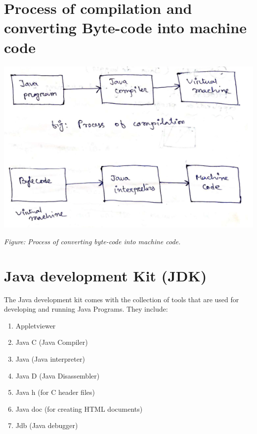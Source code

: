 \documentclass[11pt, a4paper]{book}
\begin{document}
    \section{Process of compilation and converting Byte-code into machine code}
      \includegraphics{pocacbcimc}
      
      \begin{center}
        \small \textit{Figure: Process of converting byte-code into machine code.}\normalsize
      \end{center}
  
    \section{Java development Kit (JDK)}
      The Java development kit comes with the collection of tools that are used for developing and running Java Programs. They include:
      
      \begin{enumerate}
  
        \item Appletviewer
        \item Java C (Java Compiler)
        \item Java (Java interpreter)
        \item Java D (Java Disassembler)
        \item Java h (for C header files)
        \item Java doc (for creating HTML documents)
        \item Jdb (Java debugger)
  
      \end{enumerate}
  
\end{document}
